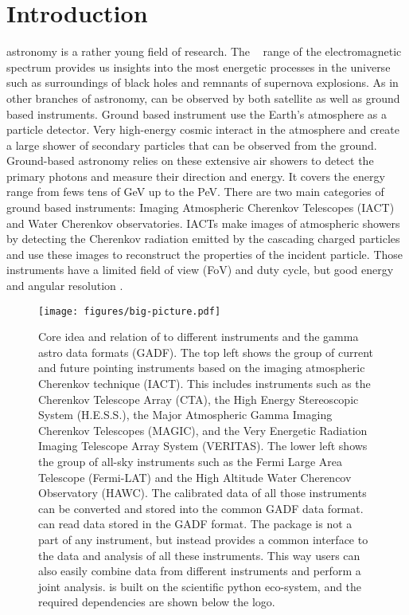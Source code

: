 \documentclass[traditabstract, longauth]{aa}
\begin{document}
\maketitle

\section{Introduction}
\label{sec:introduction}


\gammaray astronomy is a rather young field of research. The \gammaray~
range of the electromagnetic spectrum provides us insights into the
most energetic processes in the universe such as surroundings of
black holes and remnants of supernova explosions. As in other
branches of astronomy, \gammarays can be observed by both
satellite as well as ground based instruments.
Ground based instrument use the Earth's atmosphere as a particle detector.
Very high-energy cosmic \gammarays interact in the atmosphere and
create a large shower of secondary particles that can be observed from the ground.
Ground-based \gammaray astronomy relies on these extensive air showers to detect the
primary \gammaray photons and measure their direction and energy.
It covers the energy range from fews tens of GeV up to the PeV.
There are two main categories of ground based instruments: 
Imaging Atmospheric Cherenkov Telescopes (IACT) and 
Water Cherenkov observatories. IACTs make images of atmospheric showers
by detecting the Cherenkov radiation emitted by the cascading charged particles and
use these images to reconstruct the properties of the incident particle.
Those instruments have a limited field of view (FoV) and duty cycle, but
good energy and angular resolution \citep{2015CRPhy..16..610D}.

\begin{figure*}[t]
	\centering
	\texttt{[image: figures/big-picture.pdf]}
	\caption{
		Core idea and relation of \gammapy to different \gammaray instruments
		and the gamma astro data formats (GADF). The top left shows the
		group of current and future pointing instruments based on the 
		imaging atmospheric Cherenkov technique (IACT). This includes
		instruments such as the  Cherenkov Telescope Array (CTA),
		the High Energy Stereoscopic System (H.E.S.S.), the
		Major Atmospheric Gamma Imaging Cherenkov Telescopes (MAGIC),
		and the Very Energetic Radiation Imaging Telescope Array System (VERITAS).
		The lower left shows the group of all-sky instruments such as the
		Fermi Large Area Telescope (Fermi-LAT) and the High Altitude
		Water Cherencov Observatory (HAWC). The calibrated data of all those
		instruments can be converted and stored into the common GADF data format.
		\gammapy can read data stored in the GADF format.
		The \gammapy package is not a part of any instrument, but instead
		provides a common interface to the data and analysis of all
		these \gammaray instruments. This way users can also easily combine data from
		different instruments and perform a joint analysis.
		\gammapy is built on the scientific python eco-system, and the required dependencies
		are shown below the \gammapy logo.
	}
	\label{fig:big_picture}

\end{figure*}
\end{document}
